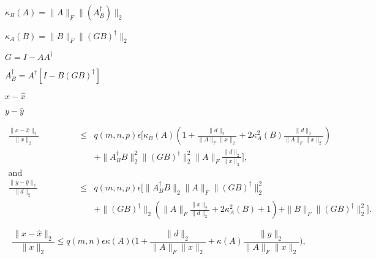 {\newpage\clearpage
{}%
$\kappa_B(A) =  \| A \|_F  \| (A^\dagger_B) \|_2 $%
\lthtmlinlinemathZ
\lthtmlcheckvsize\clearpage}

{\newpage\clearpage
{}%
$\kappa_A(B) =  \| B \|_F  \| (GB)^\dagger \|_2 $%
\lthtmlinlinemathZ
\lthtmlcheckvsize\clearpage}

{\newpage\clearpage
{}%
$G = I - AA^\dagger$%
\lthtmlinlinemathZ
\lthtmlcheckvsize\clearpage}

{\newpage\clearpage
{}%
$A^\dagger_B = A^\dagger[I-B(GB)^\dagger]$%
\lthtmlinlinemathZ
\lthtmlcheckvsize\clearpage}

{\newpage\clearpage
{}%
$x-\widehat {x}$%
\lthtmlinlinemathZ
\lthtmlcheckvsize\clearpage}

{\newpage\clearpage
{}%
$y - \widehat {y}$%
\lthtmlinlinemathZ
\lthtmlcheckvsize\clearpage}

{\newpage\clearpage
{}%
\begin{eqnarray*}
 \frac{ \| x-\widehat {x} \|_2 }{ \| x \|_2 } & \leq & q(m,n,p)\epsilon
      \Bigg[ \kappa_B(A)\left( 1 + \frac{ \| d \|_2 }{ \| A \|_F  \| x \|_2 }
         + 2\kappa^2_A(B)
              \frac{ \| d \|_2 }{ \| A \|_F  \| x \|_2 } \right)  \\
    &   & {}  +  \| A^\dagger_BB \|_2 ^2
              \| (GB)^\dagger \|_2 ^2 \| A \|_F \frac{ \| d \|_2 }{ \| x \|_2 }
       \Bigg],  \\
\mbox{and} \hspace{1in} {} & & \\
  \frac{ \| y - \widehat {y} \|_2 }{ \| d \|_2 }
    & \leq & q(m,n,p)\epsilon
         \bigg[  \| A^\dagger_BB \|_2 
                     \| A \|_F  \| (GB)^\dagger \|_2 ^2 \\
     & & {} +  \| (GB)^\dagger \|_2 
             \left( \| A \|_F \frac{ \| x \|_2 }{ \| d \|_2 }
             + 2\kappa^2_A(B) + 1\right)
             +  \| B \|_F  \| (GB)^\dagger \|_2 ^2 \bigg] .
\end{eqnarray*}%
\lthtmldisplayZ
\lthtmlcheckvsize\clearpage}

{\newpage\clearpage
{}%
\begin{displaymath}
 \frac{ \| x-\widehat {x} \|_2 }{ \| x \|_2 } \leq q(m,n)\epsilon
      \kappa(A)\Bigg( 1 + \frac{ \| d \|_2 }{ \| A \|_F  \| x \|_2 }
         + \kappa(A)\frac{ \| y \|_2 }{ \| A \|_F  \| x \|_2 } \Bigg),
\end{displaymath}%
\lthtmldisplayZ
\lthtmlcheckvsize\clearpage}

